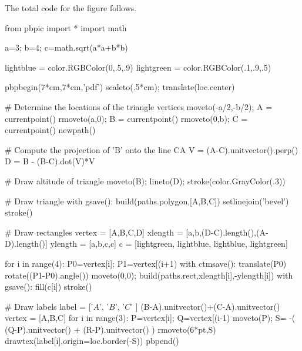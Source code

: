 \documentclass[12pt]{article}
\begin{document}
The total code for the figure follows.
\begin{snippet}
from pbpic import *
import math

a=3; b=4; c=math.sqrt(a*a+b*b)

lightblue = color.RGBColor(0,.5,.9)
lightgreen = color.RGBColor(.1,.9,.5)

pbpbegin(7*cm,7*cm,'pdf')
scaleto(.5*cm); translate(loc.center)

# Determine the locations of the triangle vertices
moveto(-a/2,-b/2); A = currentpoint()
rmoveto(a,0); B = currentpoint()
rmoveto(0,b); C = currentpoint()
newpath()

# Compute the projection of 'B' onto the line CA
V = (A-C).unitvector().perp()
D = B - (B-C).dot(V)*V

# Draw altitude of triangle
moveto(B); lineto(D);
stroke(color.GrayColor(.3))

# Draw triangle
with gsave():
  build(paths.polygon,[A,B,C])
  setlinejoin('bevel')
  stroke()

# Draw rectangles
vertex = [A,B,C,D]
xlength = [a,b,(D-C).length(),(A-D).length()]
ylength = [a,b,c,c]
c = [lightgreen, lightblue, lightblue, lightgreen]

for i in range(4):
  P0=vertex[i]; P1=vertex[(i+1)%
  with ctmsave():
    translate(P0)
    rotate((P1-P0).angle())
    moveto(0,0);
    build(paths.rect,xlength[i],-ylength[i])
  with gsave():
    fill(c[i])
  stroke()

# Draw labels
label = ['$A$', '$B$', '$C$' ]
(B-A).unitvector()+(C-A).unitvector()
vertex = [A,B,C]
for i in range(3):
  P=vertex[i]; Q=vertex[(i-1)%
  moveto(P);
  S= -( (Q-P).unitvector() + (R-P).unitvector() )
  rmoveto(6*pt,S)
  drawtex(label[i],origin=loc.border(-S))
pbpend()
\end{snippet}
\end{document}
